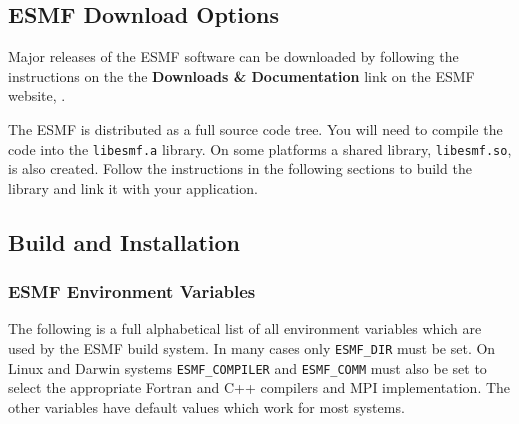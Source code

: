 
\subsection{ESMF Download Options}

Major releases of the ESMF software can be downloaded by following
the instructions on the 
the {\bf Downloads \& Documentation} link on the ESMF 
website, .

The ESMF is distributed as a full source code tree.  You will need
to compile the code into the {\tt libesmf.a} library.
On some platforms a shared library, {\tt libesmf.so}, is also created.
Follow the instructions in the following sections
to build the library and link it with your application.

\subsection{Build and Installation}
\label{BuildProcedures}



\subsubsection{ESMF Environment Variables}
\label{EnvironmentVariables}

The following is a full alphabetical list of all environment variables which
are used by the ESMF build system. In many cases only {\tt ESMF\_DIR} must be 
set. On Linux and Darwin systems {\tt ESMF\_COMPILER} and {\tt ESMF\_COMM} must
also be set to select the appropriate Fortran and C++ compilers and MPI 
implementation. The other variables have default values which work for
most systems.

